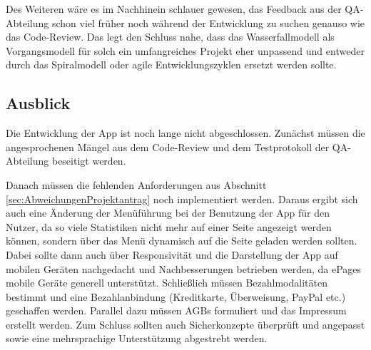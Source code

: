 Des Weiteren wäre es im Nachhinein schlauer gewesen, das Feedback aus der QA-Abteilung schon viel früher noch während der Entwicklung zu suchen genauso wie das Code-Review. Das legt den Schluss nahe, dass das Wasserfallmodell als Vorgangsmodell für solch ein umfangreiches Projekt eher unpassend und entweder durch das Spiralmodell oder agile Entwicklungszyklen ersetzt werden sollte.


\subsection{Ausblick}
\label{sec:Ausblick}

Die Entwicklung der App ist noch lange nicht abgeschlossen. Zunächst müssen die angesprochenen Mängel aus dem Code-Review und  dem Testprotokoll der QA-Abteilung beseitigt werden.

Danach müssen die fehlenden Anforderungen aus Abschnitt \ref{sec:AbweichungenProjektantrag} noch implementiert werden. Daraus ergibt sich auch eine Änderung der Menüführung bei der Benutzung der App für den Nutzer, da so viele Statistiken nicht mehr auf einer Seite angezeigt werden können, sondern über das Menü dynamisch auf die Seite geladen werden sollten. Dabei sollte dann auch über Responsivität und die Darstellung der App auf mobilen Geräten nachgedacht und Nachbesserungen betrieben werden, da ePages mobile Geräte generell unterstützt. Schließlich müssen Bezahlmodalitäten bestimmt und eine Bezahlanbindung (Kreditkarte, Überweisung, PayPal etc.) geschaffen werden. Parallel dazu müssen \acs{AGB}s formuliert und das Impressum erstellt werden. Zum Schluss sollten auch Sicherkonzepte überprüft und angepasst sowie eine mehrsprachige Unterstützung abgestrebt werden.
